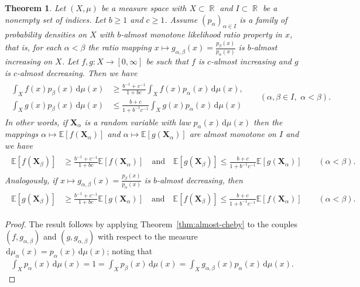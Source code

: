 \documentclass[12pt, reqno]{amsart}%
\theoremstyle{plain}  %
\newtheorem{theorem}{Theorem}[section]
\theoremstyle{definition}  %
\theoremstyle{remark}
\numberwithin{equation}{section}
\DeclareMathOperator{\R}{\mathbb{R}}
\renewcommand{\d}{\,\mathrm{d}}
\begin{document}
\begin{theorem}
\label{thm:mlr-almost}
Let $(X, \mu)$ be a measure space with $X\subset \R$ and $I\subset \R$ be a  nonempty set of indices. Let $b\geq 1$ and $c\geq 1$.  Assume $(p_\alpha)_{\alpha\in I}$ is a family of probability densities on $X$ with $b$-almost monotone likelihood ratio property in $x$, that is,  for each $\alpha<\beta$ the ratio mapping $x\mapsto g_{\alpha,\beta}(x)= \frac{p_\beta(x)}{p_\alpha(x)} $ is $b$-almost increasing on $X$. Let $f ,g: X\to [0,\infty]$ be such that $f$ is $c$-almost increasing and $g$ is $c$-almost decreasing. Then we have
\begin{align*}
 \begin{split}
\int_X f(x)p_\beta(x)\d\mu(x)
&\geq \frac{b^{-1}+c^{-1}}{1+bc}
\int_X f(x)p_\alpha (x)\d \mu(x),\\
\int_X g(x)p_\beta(x)\d\mu(x)
&\leq \frac{b+c}{1+b^{-1}c^{-1} }
\int_Xg(x)p_\alpha (x)\d \mu(x)
\end{split} && (\alpha,\beta\in I,\,\, \alpha<\beta).
\end{align*}
In other words,  if $\mathbf{X}_\alpha$ is a random variable with law $p_\alpha(x)\d \mu(x)$ then  the mappings $\alpha\mapsto \mathbb{E}[f(\mathbf{X}_\alpha)]$ and  $\alpha\mapsto \mathbb{E}[g(\mathbf{X}_\alpha)]$ are almost monotone on $I$ and we have
\begin{align*}
 \begin{split}
\mathbb{E}[f(\mathbf{X}_\beta)]&\geq\frac{b^{-1}+c^{-1}}{1+bc} \mathbb{E}[f(\mathbf{X}_\alpha )]
\quad \text{and}\quad \mathbb{E}[g(\mathbf{X}_\beta)] \leq  \frac{b+c}{1+b^{-1}c^{-1} } \mathbb{E}[g(\mathbf{X}_\alpha)]
\end{split}&&(\alpha<\beta).
\end{align*}
Analogously, if $x\mapsto g_{\alpha,\beta}(x)= \frac{p_\beta(x)}{p_\alpha(x)}$
is $b$-almost decreasing, then
\begin{align*}
 \begin{split}
\mathbb{E}[g(\mathbf{X}_\beta)]&\geq\frac{b^{-1}+c^{-1}}{1+bc} \mathbb{E}[g(\mathbf{X}_\alpha )]
\quad \text{and}\quad \mathbb{E}[f(\mathbf{X}_\beta)] \leq  \frac{b+c}{1+b^{-1}c^{-1} } \mathbb{E}[f(\mathbf{X}_\alpha)]
\end{split}&&(\alpha<\beta).
\end{align*}
\end{theorem}
\begin{proof}
The result follows by  applying Theorem~\ref{thm:almost-cheby} to the couples $(f,g_{\alpha,\beta})$ and $(g,g_{\alpha,\beta})$ with respect to the measure $\d \mu_\alpha(x)= p_\alpha(x)
 \d \mu(x)$; noting that
\begin{align*}
\int_X p_\alpha(x) \d \mu(x) = 1= \int_X p_\beta(x) \d \mu(x) = \int_X g_{\alpha,\beta}(x) p_\alpha(x) \d \mu(x).
\end{align*}
\end{proof}
\end{document}
